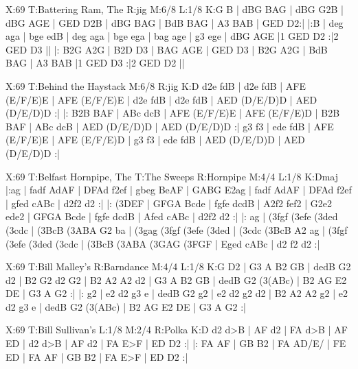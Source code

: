 \documentclass{article}
\begin{document}
\begin{abc}[name]
X:69
T:Battering Ram, The
R:jig
M:6/8
L:1/8
K:G
B | dBG BAG | dBG G2B | dBG AGE | GED D2B |
dBG BAG | BdB BAG | A3 BAB | GED D2:|
|:B | deg aga | bge edB | deg aga | bge ega |
bag age | g3 ege | dBG AGE |1 GED D2 :|2 GED D3 ||
|: B2G A2G | B2D D3 | BAG AGE | GED D3 |
B2G A2G | BdB BAG | A3 BAB |1 GED D3 :|2 GED D2 ||
\end{abc}

\begin{abc}[name]
X:69
T:Behind the Haystack
M:6/8
R:jig
K:D
d2e fdB | d2e fdB | AFE (E/F/E)E | AFE (E/F/E)E |
d2e fdB | d2e fdB | AED (D/E/D)D | AED (D/E/D)D :|
|: B2B BAF | ABc dcB | AFE (E/F/E)E | AFE (E/F/E)D |
B2B BAF | ABc dcB | AED (D/E/D)D | AED (D/E/D)D :|
g3 f3 | ede fdB | AFE (E/F/E)E | AFE (E/F/E)D |
g3 f3 | ede fdB | AED (D/E/D)D | AED (D/E/D)D :|
\end{abc}

\begin{abc}[name]
X:69
T:Belfast Hornpipe, The
T:The Sweeps
R:Hornpipe
M:4/4
L:1/8
K:Dmaj
|:ag | fadf AdAF | DFAd f2ef | gbeg BeAF | GABG E2ag |
fadf AdAF | DFAd f2ef | gfed cABc | d2f2 d2 :|
|: (3DEF | GFGA Bcde | fgfe dcdB | A2f2 fef2 | G2e2 ede2 |
GFGA Bcde | fgfe dcdB | Afed cABc | d2f2 d2 :|
|: ag | (3fgf (3efe (3ded (3cdc | (3BcB (3ABA G2 ba | (3gag (3fgf (3efe (3ded | (3cdc (3BcB A2 ag |
(3fgf (3efe (3ded (3cdc | (3BcB (3ABA (3GAG (3FGF | Eged cABc | d2 f2 d2 :|
\end{abc}

\begin{abc}[name]
X:69
T:Bill Malley's
R:Barndance
M:4/4
L:1/8
K:G
D2 | G3 A B2 GB | dedB G2 d2 | B2 G2 d2 G2 | B2 A2 A2 d2 |
G3 A B2 GB | dedB G2 (3(ABc) | B2 AG E2 DE | G3 A G2 :|
|: g2 | e2 d2 g3 e | dedB G2 g2 | e2 d2 g2 d2 | B2 A2 A2 g2 |
e2 d2 g3 e | dedB G2 (3(ABc) | B2 AG E2 DE | G3 A G2 :|
\end{abc}

\begin{abc}[name]
X:69
T:Bill Sullivan's
L:1/8
M:2/4
R:Polka
K:D
d2 d>B | AF d2 | FA d>B | AF ED |
d2 d>B | AF d2 | FA E>F | ED D2 :|
|: FA AF | GB B2 | FA AD/E/ | FE ED |
FA AF | GB B2 | FA E>F | ED D2 :|
\end{abc}
\end{document}
